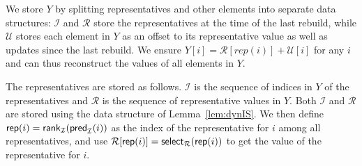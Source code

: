 We store $Y$ by splitting representatives and other elements into separate data structures: $\mathcal{I}$ and $\mathcal{R}$ store the representatives at the time of the last rebuild, while $\mathcal{U}$ stores each element in $Y$ as an offset to its representative value as well as updates since the last rebuild. We ensure $Y[i] = \mathcal{R}[rep(i)]+\mathcal{U}[i]$ for any $i$ and can thus reconstruct the values of all elements in $Y$.


The representatives are stored as follows. $\mathcal{I}$ is the sequence of indices in $Y$ of the representatives and $\mathcal{R}$ is the sequence of representative values in $Y$. Both $\mathcal{I}$ and $\mathcal{R}$ are stored using the data structure of Lemma~\ref{lem:dynIS}. We then define $\mathsf{rep}(i) = \mathsf{rank}_\mathcal{I}(\mathsf{pred}_\mathcal{I}(i))$ as the index of the representative for $i$ among all representatives, and use $\mathcal{R}[\mathsf{rep}(i)] = \mathsf{select}_\mathcal{R}(\mathsf{rep}(i))$ to get the value of the representative for $i$.



